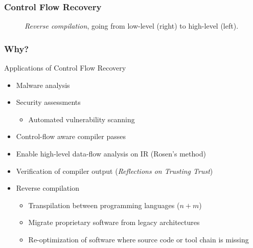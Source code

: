 \documentclass[aspectratio=1610]{beamer}
\begin{document}
\begin{frame}
	\frametitle{Control Flow Recovery}

	\begin{figure}[htbp]
		\centering
		\begin{subfigure}[t]{0.27\textwidth}
			\centering
			
		\end{subfigure}
		\quad
		\begin{subfigure}[t]{0.52\textwidth}
			\centering
			
		\end{subfigure}
		\caption{\textit{Reverse compilation}, going from low-level (right) to high-level (left).}
	\end{figure}

\end{frame}




\begin{frame}
	\frametitle{Why?}

	\begin{block}{Applications of Control Flow Recovery}
		\begin{itemize}
			\item Malware analysis
			\item Security assessments
			\begin{itemize}
				\item Automated vulnerability scanning
			\end{itemize}
			\item Control-flow aware compiler passes
			\item Enable high-level data-flow analysis on IR (Rosen's method)
			\item Verification of compiler output (\textit{Reflections on Trusting Trust})
			\item Reverse compilation
			\begin{itemize}
				\item Transpilation between programming languages ($n + m$)
				\item Migrate proprietary software from legacy architectures
				\item Re-optimization of software where source code or tool chain is missing
			\end{itemize}
		\end{itemize}
	\end{block}
\end{frame}
\end{document}
